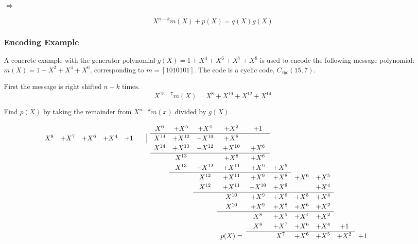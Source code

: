 \documentclass[Main]{subfiles}
\begin{document}
$\Leftrightarrow$

\begin{equation}
X^{n-k}m(X)+p(X) = q(X)g(X)
\label{eq:encoding}
\end{equation}

\subsubsection{Encoding Example}
\noindent A concrete example with the generator polynomial $g(X)=1+X^4+X^6+X^7+X^8$ is used to encode the following message polynomial:
$m(X)=1+X^2+X^4+X^6$, corresponding to $m=[1010101]$. The code is a cyclic code, $C_{cyc}(15,7)$.

\noindent First the message is right shifted $n-k$ times.
\begin{equation}
X^{15-7}m(X) = X^8+X^{10}+X^{12}+X^{14}
\end{equation}

\noindent Find $p(X)$ by taking the remainder from $X^{n-k}m(x)$ divided by $g(X)$.

\[
\renewcommand\arraystretch{1.2}
\begin{array}{cccccccccccccccccc}
& & & & & X^6 & + X^5 &  +X^4 & +X^2 & +1 & & & & & & & \\
\cline{6-10}
 X^8 & + X^7 & +X^6 & +X^4 & +1 \qquad \vline & X^{14} & +X^{12} & +X^{10} & + X^8 & & & & & & & & \\
& & & & & X^{14} & + X^{13}& + X^{12} & +X^{10} & +X^6 & & & & & & & \\
\cline{6-10}
& & & & & & X^{13} & & +X^8 & +X^6 & & & & & & &\\
&  &&    &&    &  X^{13} & +X^{12} & +X^{11} & +X^9 & +X^5 & \\
\cline{7-11}
& & &&  &&    &  X^{12} & +X^{11} & +X^9 & +X^8 & +X^6 & +X^5  \\
& & &&  &&    &  X^{12} & +X^{11} & +X^{10} & +X^8 & & +X^4  \\
\cline{8-13}
&  &&    &    &   & &  & X^{10} & +X^9 & +X^6 & +X^5 & +X^4 \\
&  &&    &    &   & &  & X^{10} & +X^9 & +X^8 & +X^6 & +X^2 \\
\cline{9-13}
&  &&    &    &   & & & & X^{8} & +X^5 & +X^4 & +X^2 \\
&  &&    &    &   & & & & X^{8} & +X^7 & +X^6 & +X^4 & +1 \\
\cline{10-14}
&  &&  & & & & & p(X) = & & X^{7} & +X^6 & +X^5 & +X^2 & +1 \\
\end{array}
\]
\end{document}

